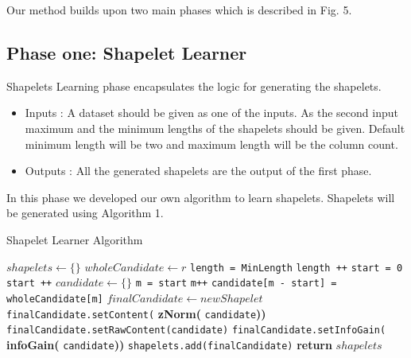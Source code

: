 \documentclass[letterpaper, 10 pt, conference]{IEEEtran}  %
\begin{document}
Our method builds upon two main phases which is described in Fig. 5.

\subsection{Phase one: Shapelet Learner}
Shapelets Learning phase encapsulates the logic for generating the shapelets.
\begin{itemize}
\item Inputs : A dataset should be given as one of the inputs. As the second input maximum and the minimum lengths of the shapelets should be given. Default minimum length will be two and maximum length will be the column count.
\item Outputs : All the generated shapelets are the output of the first phase.
\end{itemize}

In this phase we developed our own algorithm to learn shapelets. Shapelets will be generated using Algorithm 1.

\begin{algorithm}
\caption{Shapelet Learner Algorithm}\label{shapeletLearner}
\begin{algorithmic}[1]
\State $shapelets \gets \{\}$
	\State $wholeCandidate \gets r$
	\State \texttt{length = MinLength}
		\State \texttt{length ++}
		\State \texttt{start = 0}
            		\State \texttt{start ++}
            		\State $candidate \gets \{\}$
           			\State \texttt{m = start}
                		\State \texttt{m++}
                		\State \texttt{candidate[m - start] = wholeCandidate[m]}
                	\EndWhile
                	\State $finalCandidate \gets newShapelet$
                	\State \texttt{finalCandidate.setContent(} \textbf{zNorm(} \texttt{candidate}\textbf{))}
                	\State \texttt{finalCandidate.setRawContent(candidate)}
                	\State \texttt{finalCandidate.setInfoGain(} \textbf{infoGain(} \texttt{candidate}\textbf{))}
                	\State \texttt{shapelets.add(finalCandidate)}
            	\EndWhile
      \EndWhile
\EndFor
\State \textbf{return} $shapelets$
\EndProcedure
\end{algorithmic}
\end{algorithm}
\end{document}
